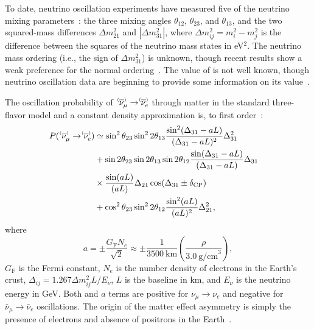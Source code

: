 To date, neutrino oscillation experiments have measured five of the neutrino mixing parameters~\cite{Esteban:2018azc,deSalas:2017kay,Capozzi:2017yic}: the three mixing angles $\theta_{12}$, $\theta_{23}$, and $\theta_{13}$, and the two squared-mass differences $\Delta m^{2}_{21}$ and $|\Delta m^{2}_{31}|$, where $\Delta m^2_{ij} = m^2_{i} - m^{2}_{j}$ is the difference between the squares of the neutrino mass states in eV$^{2}$.
The neutrino mass ordering (i.e., the sign of $\Delta m^{2}_{31}$) is unknown, though recent results show a weak preference for the normal ordering~\cite{Abe:2021gky,PhysRevD.97.072001,PhysRevLett.123.151803}.
The value of \deltacp is not well known, though neutrino oscillation data are beginning to provide some information on its value~\cite{Abe:2019vii,Abe:2021gky}.

The oscillation probability of $\;\nu^{\bracketbar}_\mu \rightarrow \nu^{\bracketbar}_e$ through matter in the standard three-flavor model and a constant density approximation is, to first order~\cite{Nunokawa:2007qh}:
\begin{equation}
  \begin{aligned}
    P(\;\nu^{\bracketbar}_\mu \rightarrow \nu^{\bracketbar}_e) & \simeq \sin^2 \theta_{23} \sin^2 2 \theta_{13} 
    \frac{ \sin^2(\Delta_{31} - aL)}{(\Delta_{31}-aL)^2} \Delta_{31}^2 \\
    & + \sin 2 \theta_{23} \sin 2 \theta_{13} \sin 2 \theta_{12}\frac{ \sin(\Delta_{31} - aL)}{(\Delta_{31}-aL)} \Delta_{31} \\
    &\times \frac{\sin(aL)}{(aL)} \Delta_{21} \cos (\Delta_{31} \pm \deltacp) & \\
    & + \cos^2 \theta_{23} \sin^2 2 \theta_{12} \frac {\sin^2(aL)}{(aL)^2} \Delta_{21}^2,
  \end{aligned}
  \label{eqn:appprob}
\end{equation}
where
\begin{equation*}
  a = \pm \frac{G_{\mathrm{F}}N_e}{\sqrt{2}} \approx \pm\frac{1}{3500~\mathrm{km}}\left(\frac{\rho}{3.0~\mathrm{g/cm}^{3}}\right),
\end{equation*}
$G_{\mathrm{F}}$ is the Fermi constant, $N_e$ is the number density of electrons in the Earth's crust, $\Delta_{ij} = 1.267 \Delta m^2_{ij} L/E_\nu$, $L$ is the baseline in km, and $E_\nu$ is the neutrino energy in GeV. 
Both \deltacp and $a$ terms are positive for $\nu_\mu \to \nu_e$ and negative for $\bar{\nu}_\mu \to \bar{\nu}_e$ oscillations. The origin of the matter effect asymmetry 
is simply the presence of electrons and absence of positrons in the Earth~\cite{Wolfenstein:1977ue,Mikheev:1986gs}.

